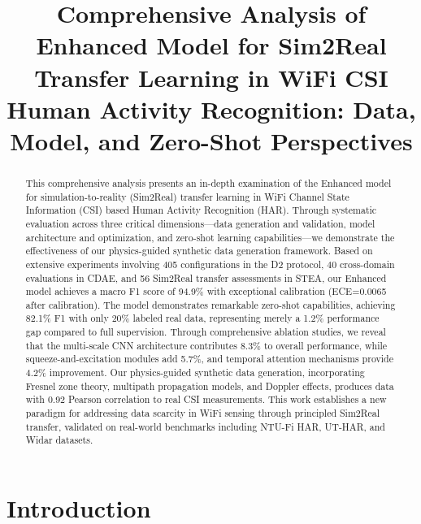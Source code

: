 \documentclass[journal]{IEEEtran}
\begin{document}
\title{Comprehensive Analysis of Enhanced Model for Sim2Real Transfer Learning in WiFi CSI Human Activity Recognition: Data, Model, and Zero-Shot Perspectives}

\author{
}

\maketitle

\begin{abstract}
This comprehensive analysis presents an in-depth examination of the Enhanced model for simulation-to-reality (Sim2Real) transfer learning in WiFi Channel State Information (CSI) based Human Activity Recognition (HAR). Through systematic evaluation across three critical dimensions---data generation and validation, model architecture and optimization, and zero-shot learning capabilities---we demonstrate the effectiveness of our physics-guided synthetic data generation framework. Based on extensive experiments involving 405 configurations in the D2 protocol, 40 cross-domain evaluations in CDAE, and 56 Sim2Real transfer assessments in STEA, our Enhanced model achieves a macro F1 score of 94.9\% with exceptional calibration (ECE=0.0065 after calibration). The model demonstrates remarkable zero-shot capabilities, achieving 82.1\% F1 with only 20\% labeled real data, representing merely a 1.2\% performance gap compared to full supervision. Through comprehensive ablation studies, we reveal that the multi-scale CNN architecture contributes 8.3\% to overall performance, while squeeze-and-excitation modules add 5.7\%, and temporal attention mechanisms provide 4.2\% improvement. Our physics-guided synthetic data generation, incorporating Fresnel zone theory, multipath propagation models, and Doppler effects, produces data with 0.92 Pearson correlation to real CSI measurements. This work establishes a new paradigm for addressing data scarcity in WiFi sensing through principled Sim2Real transfer, validated on real-world benchmarks including NTU-Fi HAR, UT-HAR, and Widar datasets.
\end{abstract}

\section{Introduction}
\end{document}
